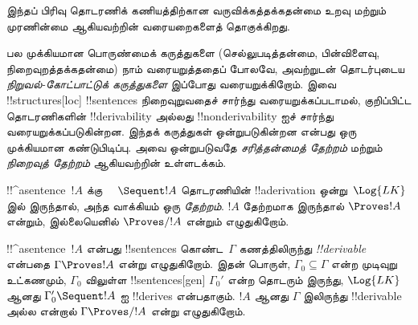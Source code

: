 \documentclass[../../../include/open-logic-section]{subfiles}
\begin{document}
\begin{editorial}
  இந்தப் பிரிவு தொடரணிக் கணியத்திற்கான வருவிக்கத்தக்கதன்மை உறவு மற்றும்
  முரணின்மை ஆகியவற்றின் வரையறைகளைத் தொகுக்கிறது.
\end{editorial}

      {}
      {}


\begin{explain}
பல முக்கியமான பொருண்மைக் கருத்துகளை (செல்லுபடித்தன்மை, பின்விளைவு,
நிறைவுறத்தக்கதன்மை) நாம் வரையறுத்ததைப் போலவே, அவற்றுடன் தொடர்புடைய
\emph{நிறுவல்-கோட்பாட்டுக் கருத்துகளை} இப்போது வரையறுக்கிறோம். இவை
!!{structure}s[loc] !!{sentence}s நிறைவுறுவதைச் சார்ந்து வரையறுக்கப்படாமல்,
குறிப்பிட்ட தொடரணிகளின் !!{derivability} அல்லது !!{nonderivability} ஐச்
சார்ந்து வரையறுக்கப்படுகின்றன. இந்தக் கருத்துகள் ஒன்றுபடுகின்றன என்பது ஒரு
முக்கியமான கண்டுபிடிப்பு. அவை ஒன்றுபடுவதே \emph{சரித்தன்மைத் தேற்றம்} மற்றும்
\emph{நிறைவுத் தேற்றம்} ஆகியவற்றின் உள்ளடக்கம்.
\end{explain}

\begin{defn}[தேற்றங்கள்]
!!^a{sentence}~$!A$ க்கு $\quad \Sequent !A$ தொடரணியின்
!!a{derivation} ஒன்று~$\Log{LK}$ இல் இருந்தால், அந்த வாக்கியம் ஒரு \emph{தேற்றம்}.
$!A$ தேற்றமாக இருந்தால் $\Proves !A$ என்றும், இல்லையெனில் $\Proves/ !A$
என்றும் எழுதுகிறோம்.
\end{defn}

\begin{defn}[!!^{derivability}]
!!^a{sentence}~$!A$ என்பது !!{sentence}s கொண்ட~$\Gamma$ கணத்திலிருந்து
\emph{!!{derivable}} என்பதை $\Gamma \Proves !A$ என்று எழுதுகிறோம். இதன்
பொருள், $\Gamma_0 \subseteq \Gamma$ என்ற முடிவுறு உட்கணமும்,
$\Gamma_0$ விலுள்ள !!{sentence}s[gen] $\Gamma_0'$ என்ற தொடரும் இருந்து,
$\Log{LK}$ ஆனது $\Gamma_0' \Sequent !A$ ஐ !!{derive}s என்பதாகும். $!A$
ஆனது $\Gamma$ இலிருந்து !!{derivable} அல்ல என்றால் $\Gamma \Proves/ !A$
என்று எழுதுகிறோம்.
\end{defn}
\end{document}

